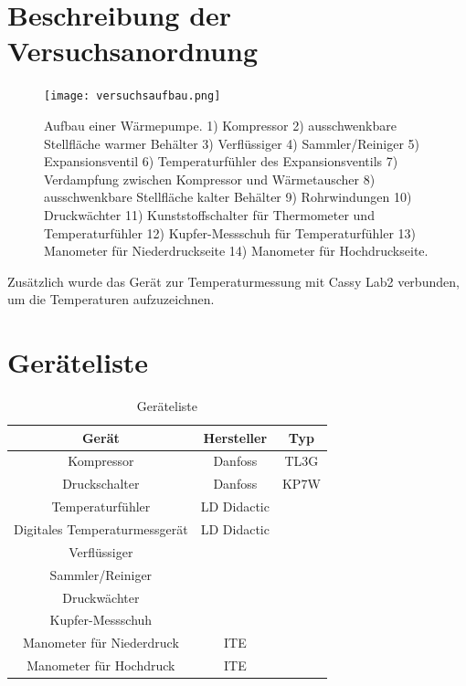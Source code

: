 \documentclass{article}
\begin{document}
\section{Beschreibung der Versuchsanordnung}
\begin{figure}[!htbp]
\begin{center} \texttt{[image: versuchsaufbau.png]}  
\caption{
Aufbau einer Wärmepumpe. 1) Kompressor 2) ausschwenkbare  Stellfläche warmer Behälter 3) Verflüssiger 4) Sammler/Reiniger 5) Expansionsventil 6) Temperaturfühler des Expansionsventils 7) Verdampfung zwischen Kompressor und Wärmetauscher 8) ausschwenkbare Stellfläche kalter Behälter 9) Rohrwindungen 10) Druckwächter 11) Kunststoffschalter für Thermometer und Temperaturfühler 12) Kupfer-Messschuh für Temperaturfühler 13) Manometer für Niederdruckseite 14) Manometer für Hochdruckseite.\cite{pumpenscript}}
\label{hfab}
\end{center}
\end{figure}
%
Zusätzlich wurde das Gerät zur Temperaturmessung mit Cassy Lab2 verbunden, um die Temperaturen aufzuzeichnen.



\newpage

\section{Ger\"ateliste}


\begin{table}[!h]
\caption{Geräteliste}
\centering
\label{tab:items}
\begin{tabular}{|c|c|c|}
\hline
\textbf{Gerät}    & \textbf{Hersteller} & \textbf{Typ}      \\ \hline
Kompressor       & Danfoss & TL3G              \\ \hline
Druckschalter       & Danfoss & KP7W             \\ \hline
Temperaturfühler  & LD Didactic &                  \\ \hline
Digitales Temperaturmessgerät  & LD Didactic &                 \\ \hline
Verflüssiger  &     &                \\ \hline
Sammler/Reiniger  &      &              \\ \hline
Druckwächter  &          &          \\ \hline
Kupfer-Messschuh  &      &              \\ \hline
Manometer für Niederdruck & ITE   &                \\ \hline
Manometer für Hochdruck &  ITE   &                \\  \hline

\end{tabular}
\end{table}
\end{document}
